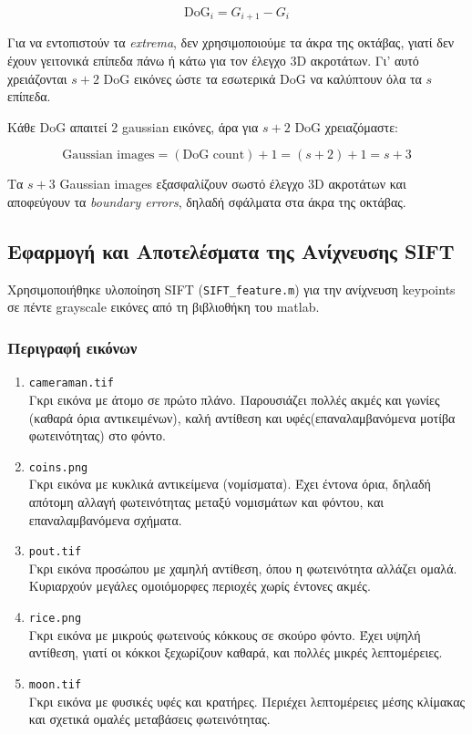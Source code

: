 \documentclass[12pt]{article}
\begin{document}
    \[
    \text{DoG}_i = G_{i+1} - G_i
    \]
    
    Για να εντοπιστούν τα \textit{extrema}, δεν χρησιμοποιούμε τα άκρα της οκτάβας, γιατί δεν έχουν γειτονικά επίπεδα πάνω ή κάτω για τον έλεγχο 3D ακροτάτων. Γι' αυτό χρειάζονται $s+2$ DoG εικόνες ώστε τα εσωτερικά DoG να καλύπτουν όλα τα $s$ επίπεδα.
    
    Κάθε DoG απαιτεί 2 gaussian εικόνες, άρα για $s+2$ DoG χρειαζόμαστε:
    
    \[
    \text{Gaussian images} = (\text{DoG count}) + 1 = (s+2) + 1 = s+3
    \]
    
    Τα $s+3$ Gaussian images εξασφαλίζουν σωστό έλεγχο 3D ακροτάτων και αποφεύγουν τα \textit{boundary errors}, δηλαδή σφάλματα στα άκρα της οκτάβας.
    
    
    \subsection{Εφαρμογή και Αποτελέσματα της Ανίχνευσης SIFT}
    Χρησιμοποιήθηκε υλοποίηση SIFT (\texttt{SIFT\_feature.m}) για την ανίχνευση keypoints σε πέντε grayscale εικόνες από τη βιβλιοθήκη του matlab.
    \subsubsection{Περιγραφή εικόνων}
    \begin{enumerate}
      \item \texttt{cameraman.tif} \\
      Γκρι εικόνα με άτομο σε πρώτο πλάνο. Παρουσιάζει πολλές ακμές και γωνίες (καθαρά όρια αντικειμένων), καλή αντίθεση και υφές(επαναλαμβανόμενα μοτίβα φωτεινότητας) στο φόντο.
  
      \item \texttt{coins.png} \\
      Γκρι εικόνα με κυκλικά αντικείμενα (νομίσματα). Έχει έντονα όρια, δηλαδή απότομη αλλαγή φωτεινότητας μεταξύ νομισμάτων και φόντου, και επαναλαμβανόμενα σχήματα.
  
      \item \texttt{pout.tif} \\
      Γκρι εικόνα προσώπου με χαμηλή αντίθεση, όπου η φωτεινότητα αλλάζει ομαλά. Κυριαρχούν μεγάλες ομοιόμορφες περιοχές χωρίς έντονες ακμές.
  
      \item \texttt{rice.png} \\
      Γκρι εικόνα με μικρούς φωτεινούς κόκκους σε σκούρο φόντο. Έχει υψηλή αντίθεση, γιατί οι κόκκοι ξεχωρίζουν καθαρά, και πολλές μικρές λεπτομέρειες.
  
      \item \texttt{moon.tif} \\
      Γκρι εικόνα με φυσικές υφές και κρατήρες. Περιέχει λεπτομέρειες μέσης κλίμακας και σχετικά ομαλές μεταβάσεις φωτεινότητας.
  \end{enumerate}
  
\end{document}
